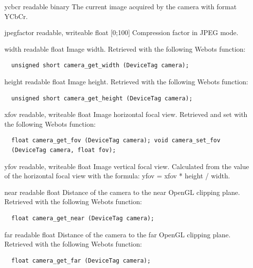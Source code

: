 \begin{itemize}
\begin{attribute}{ycbcr}
  {readable}
  {binary}
  {}
  The current image acquired by the camera with format
  YCbCr.
\end{attribute}

\begin{attribute}{jpegfactor}
  {readable, writeable}
  {float}
  {[0;100]}
  Compression factor in JPEG mode.
\end{attribute}

\begin{attribute}{width}
  {readable}
  {float}
  {}
  Image width. Retrieved with the following Webots
  function:


\begin{lstlisting}
  unsigned short camera_get_width (DeviceTag camera);
\end{lstlisting}
\end{attribute}

\begin{attribute}{height}
  {readable}
  {float}
  {}
  Image height. Retrieved with the following Webots
  function:
\begin{lstlisting}
  unsigned short camera_get_height (DeviceTag camera);
\end{lstlisting}
\end{attribute}

\begin{attribute}{xfov}
  {readable, writeable}
  {float}
  {}
  Image horizontal focal view.  Retrieved and set with
  the following Webots function:
\begin{lstlisting}
  float camera_get_fov (DeviceTag camera); void camera_set_fov
  (DeviceTag camera, float fov);
\end{lstlisting}
\end{attribute}

\begin{attribute}{yfov}
  {readable, writeable}
  {float}
  {}
  Image vertical focal view. Calculated from the value of
  the horizontal focal view with the formula: yfov = xfov * height /
  width.
\end{attribute}

\begin{attribute}{near}
  {readable}
  {float}
  {}
  Distance of the camera to the near OpenGL clipping
  plane.  Retrieved with the following Webots function:


\begin{lstlisting}
  float camera_get_near (DeviceTag camera);
\end{lstlisting}
\end{attribute}

\begin{attribute}{far}
  {readable}
  {float}
  {}
  Distance of the camera to the far OpenGL clipping
  plane.  Retrieved with the following Webots function:
\begin{lstlisting}
  float camera_get_far (DeviceTag camera);
\end{lstlisting}
\end{attribute}
\end{itemize}

